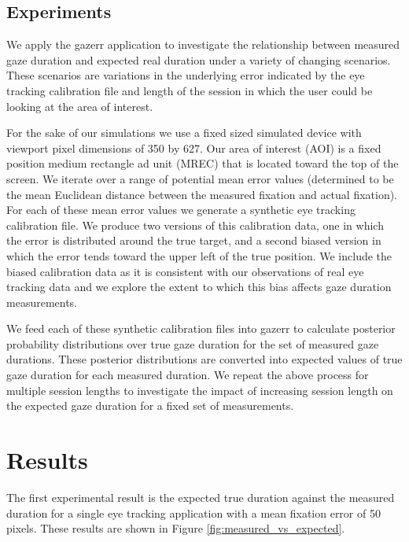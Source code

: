 \documentclass[12pt,a4paper]{article}
\numberwithin{equation}{section}
\begin{document}
\subsection{Experiments}

We apply the gazerr application to investigate the relationship between measured gaze duration
and expected real duration under a variety of changing scenarios. These scenarios are variations
in the underlying error indicated by the eye tracking calibration file and length of the session
in which the user could be looking at the area of interest.

For the sake of our simulations we use a fixed sized simulated device with viewport pixel 
dimensions of 350 by 627. Our area of interest (AOI) is a fixed position medium rectangle ad unit (MREC)
that is located toward the top of the screen. We iterate over a range of potential mean error
values (determined to be the mean Euclidean distance between the measured fixation and actual fixation).
For each of these mean error values we generate a synthetic eye tracking calibration file. We produce
two versions of this calibration data, one in which the error is distributed around the true target,
and a second biased version in which the error tends toward the upper left of the true position. We 
include the biased calibration data as it is consistent with our observations of real eye tracking data
and we explore the extent to which this bias affects gaze duration measurements.

We feed each of these synthetic calibration files into gazerr to calculate posterior probability
distributions over true gaze duration for the set of measured gaze durations. These posterior
distributions are converted into expected values of true gaze duration for each measured duration.
We repeat the above process for multiple session lengths to investigate the impact of increasing
session length on the expected gaze duration for a fixed set of measurements.

\section{Results}

The first experimental result is the expected true duration against the measured duration
for a single eye tracking application with a mean fixation error of 50 pixels. These
results are shown in Figure \ref{fig:measured_vs_expected}.
\end{document}
